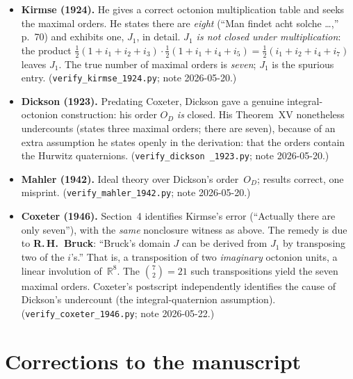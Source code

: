 \documentclass[11pt]{amsart}
\newcommand{\RR}{\mathbb{R}}
\begin{document}
\begin{itemize}
\item \textbf{Kirmse (1924).}  He gives a correct octonion multiplication
  table and seeks the maximal orders.  He states there are \emph{eight}
  (``Man findet acht solche \ldots,'' p.~70) and exhibits one, $J_1$, in
  detail.  \emph{$J_1$ is not closed under multiplication}: the product
  $\tfrac12(1{+}i_1{+}i_2{+}i_3)\cdot\tfrac12(1{+}i_1{+}i_4{+}i_5)
  =\tfrac12(i_1{+}i_2{+}i_4{+}i_7)$ leaves $J_1$.  The true number of
  maximal orders is \emph{seven}; $J_1$ is the spurious entry.
  (\texttt{verify\_kirmse\_1924.py}; note 2026-05-20.)
\item \textbf{Dickson (1923).}  Predating Coxeter, Dickson gave a genuine
  integral-octonion construction: his order $O_D$ \emph{is} closed.  His
  Theorem~XV nonetheless undercounts (states three maximal orders; there are
  seven), because of an extra assumption he states openly in the derivation:
  that the orders contain the Hurwitz quaternions.  (\texttt{verify\_dickson%
  \_1923.py}; note 2026-05-20.)
\item \textbf{Mahler (1942).}  Ideal theory over Dickson's order~$O_D$; results
  correct, one misprint.  (\texttt{verify\_mahler\_1942.py}; note
  2026-05-20.)
\item \textbf{Coxeter (1946).}  Section~4 identifies Kirmse's error
  (``Actually there are only seven''), with the \emph{same} nonclosure
  witness as above.  The remedy is due to \textbf{R.\,H.~Bruck}: ``Bruck's
  domain $J$ can be derived from $J_1$ by transposing two of the $i$'s.''
  That is, a transposition of two \emph{imaginary} octonion units, a
  linear involution of~$\RR^8$.  The $\binom72=21$ such transpositions yield
  the seven maximal orders.  Coxeter's postscript independently identifies
  the cause of Dickson's undercount (the integral-quaternion assumption).
  (\texttt{verify\_coxeter\_1946.py}; note 2026-05-22.)
\end{itemize}

\section{Corrections to the manuscript}\label{sec:items}
\end{document}
